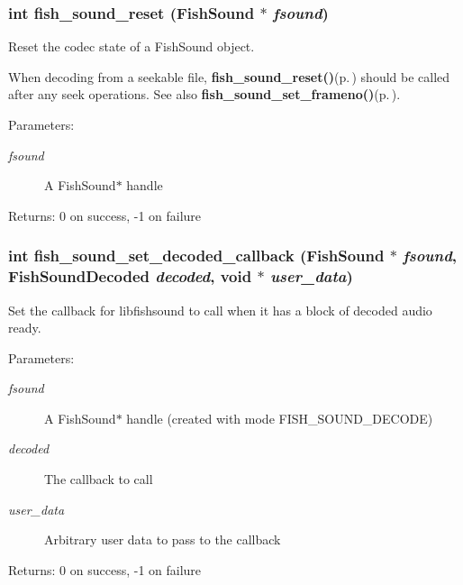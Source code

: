 \subsubsection{\setlength{\rightskip}{0pt plus 5cm}int fish\_\-sound\_\-reset ({\bf Fish\-Sound} $\ast$ {\em fsound})}\label{fishsound_8h_a10}


Reset the codec state of a Fish\-Sound object. 

When decoding from a seekable file, {\bf fish\_\-sound\_\-reset()}{\rm (p.\,\pageref{fishsound_8h_a10})} should be called after any seek operations. See also {\bf fish\_\-sound\_\-set\_\-frameno()}{\rm (p.\,\pageref{fishsound_8h_a16})}.

\begin{Desc}
\item[Parameters:]
\begin{description}
\item[{\em fsound}]A Fish\-Sound$\ast$ handle \end{description}
\end{Desc}
\begin{Desc}
\item[Returns:]0 on success, -1 on failure \end{Desc}
\subsubsection{\setlength{\rightskip}{0pt plus 5cm}int fish\_\-sound\_\-set\_\-decoded\_\-callback ({\bf Fish\-Sound} $\ast$ {\em fsound}, {\bf Fish\-Sound\-Decoded} {\em decoded}, void $\ast$ {\em user\_\-data})}\label{fishsound_8h_a5}


Set the callback for libfishsound to call when it has a block of decoded audio ready. 

\begin{Desc}
\item[Parameters:]
\begin{description}
\item[{\em fsound}]A Fish\-Sound$\ast$ handle (created with mode FISH\_\-SOUND\_\-DECODE) \item[{\em decoded}]The callback to call \item[{\em user\_\-data}]Arbitrary user data to pass to the callback \end{description}
\end{Desc}
\begin{Desc}
\item[Returns:]0 on success, -1 on failure \end{Desc}
